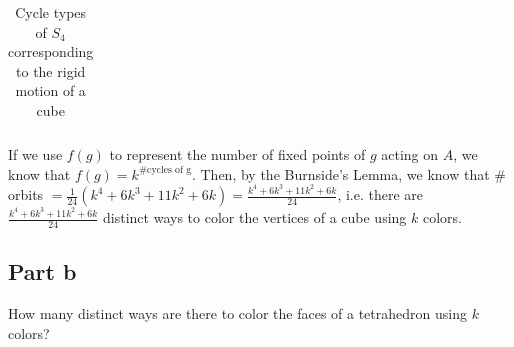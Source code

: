 \begin{answer}
\begin{table}[H]
\begin{tabular}{|c|c|l|l|}
        \end{tabular}
    \caption{Cycle types of $S_4$ corresponding to the rigid motion of a cube}
    \label{tab:tab2}
    \end{table}
    If we use $f(g)$ to represent the number of fixed points of $g$ acting on $A$, we know that $f(g) = k^{\text{\# cycles of g}}$. Then, by the Burnside's Lemma, we know that \# orbits $= \tfrac{1}{24}(k^4 + 6k^3 + 11k^2 + 6k) = \tfrac{k^4 + 6k^3 + 11k^2 + 6k}{24}$, i.e. there are $\tfrac{k^4 + 6k^3 + 11k^2 + 6k}{24}$ distinct ways to color the vertices of a cube using $k$ colors.
\end{answer}

\subsection{Part b}

\begin{question}
    How many distinct ways are there to color the faces of a tetrahedron using $k$ colors?
\end{question}

